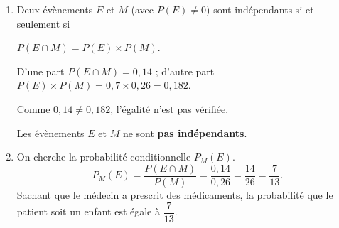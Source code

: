 \documentclass[10pt]{article}
\begin{document}
\begin{enumerate}
	La probabilité que le médecin prescrive des médicaments au patient est égale à $0,26$.
	

	\item Deux évènements $E$ et $M$ (avec $P(E) \neq 0$) sont indépendants si et seulement si
	
	$P(E \cap M) = P(E) \times P(M)$.

	D'une part $P(E \cap M) = 0,14$ ; d'autre part
	$P(E) \times P(M) = 0,7 \times 0,26 = 0,182$.

	Comme $0,14 \neq 0,182$, l'égalité n'est pas vérifiée. 

	Les évènements $E$ et $M$ ne sont \textbf{pas indépendants}.


	\item On cherche la probabilité conditionnelle $P_M(E)$.
	\[P_M(E) = \dfrac{P(E \cap M)}{P(M)} = \dfrac{0,14}{0,26} = \dfrac{14}{26} = \dfrac{7}{13}.\]
	Sachant que le médecin a prescrit des médicaments, la probabilité que le patient soit un
	enfant est égale à $\dfrac{7}{13}$.
\end{enumerate}
\end{document}
